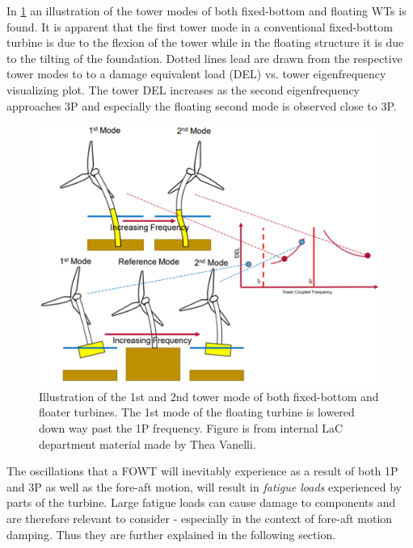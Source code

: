 \newpage
In \cref{fig:eigen_and_1p3p} an illustration of the tower modes of both fixed-bottom and floating WTs is found. It is apparent that the first tower mode in a conventional fixed-bottom turbine is due to the flexion of the tower while in the floating structure it is due to the tilting of the foundation. Dotted lines lead are drawn from the respective tower modes to to a damage equivalent load (DEL) vs. tower eigenfrequency visualizing plot. The tower DEL increases as the second eigenfrequency approaches 3P and especially the floating second mode is observed close to 3P.
\begin{figure}[ht]
	\centering
	\includegraphics[width=0.6\linewidth]{Graphics/1P3PandEigenFloater.png}
	\caption{Illustration of the 1st and 2nd tower mode of both fixed-bottom and floater turbines. The 1st mode of the floating turbine is lowered down way past the 1P frequency. Figure is from internal LaC department material made by Thea Vanelli.}
	\label{fig:eigen_and_1p3p}
\end{figure}

The oscillations that a FOWT will inevitably experience as a result of both 1P and 3P as well as the fore-aft motion, will result in \textit{fatigue loads} experienced by parts of the turbine. Large fatigue loads can cause damage to components and are therefore relevant to consider - especially in the context of fore-aft motion damping. Thus they are further explained in the following section.


\newpage
